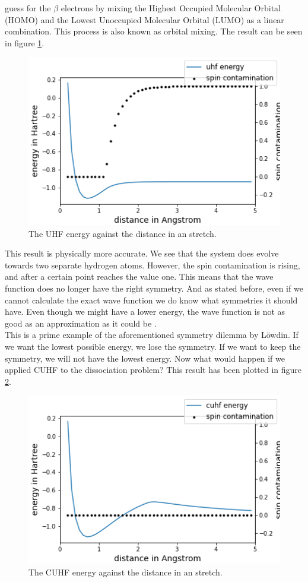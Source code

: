 guess for the $\beta$ electrons by mixing the Highest Occupied Molecular Orbital (HOMO) and the Lowest Unoccupied Molecular Orbital (LUMO) as a linear combination. This process is also
known as orbital mixing. The result can be seen in figure \ref{fig:uhfstretch}.
\begin{center}
  \begin{figure}[H]
    \centering
    \includegraphics[width=0.5\linewidth]{./img/uhf.png}
    \caption{The UHF energy against the distance in an  stretch.}
    \label{fig:uhfstretch}
  \end{figure}
\end{center}
This result is physically more accurate. We see that the system does evolve towards two separate hydrogen atoms. However, the spin contamination is rising, and after a certain point
reaches the value one. This means that the wave function does no longer have the right symmetry. And as stated before, even if we cannot calculate the exact wave function we do know
what symmetries it should have. Even though we might have a lower energy, the wave function is not as good as an approximation as it could be \cite{Scuseria2013}. \\
This is a prime example of the aforementioned symmetry dilemma by Löwdin. If we want the lowest possible energy, we lose the symmetry. If we want to keep the symmetry, we will not
have the lowest energy. Now what would happen if we applied CUHF to the dissociation problem? This result has been plotted in figure \ref{fig:cuhfstretch}.
\begin{center}
  \begin{figure}[H]
    \centering
    \includegraphics[width=0.5\linewidth]{./img/cuhf_mix.png}
    \caption{The CUHF energy against the distance in an  stretch.}
    \label{fig:cuhfstretch}
  \end{figure}
\end{center}
